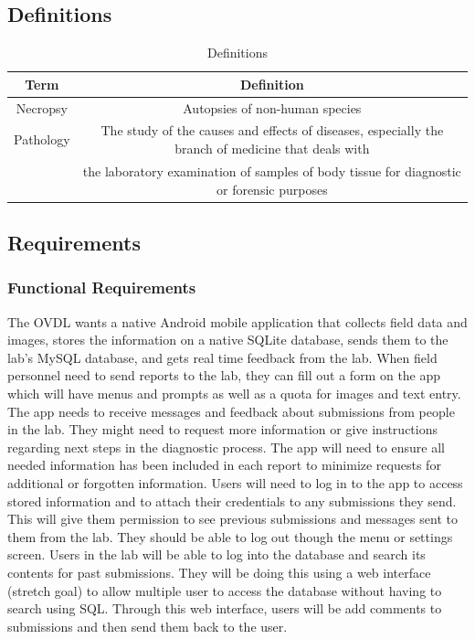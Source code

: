 \documentclass[onecolumn, draftclsnofoot,10pt, compsoc]{IEEEtran}
\begin{document}
\subsection{Definitions}
\begin{table}[ht]
\caption{Definitions}
\centering
\begin{tabular}{c|c}
\hline
    Term  &  Definition\\
    \hline
    \hline
    Necropsy   &   Autopsies of non-human species\\
    \hline
    Pathology    &   The study of the causes and effects of diseases, especially the branch of medicine that deals with \\
    & the laboratory examination of samples of body tissue for diagnostic or forensic purposes\\
    \hline
\end{tabular}
\end{table}

\subsection{Requirements}
\subsubsection{Functional Requirements}
The OVDL wants a native Android mobile application that collects field data and images, stores the information on a native SQLite database, sends them to the lab's MySQL database, and gets real time feedback from the lab. 
When field personnel need to send reports to the lab, they can fill out a form on the app which will have menus and prompts as well as a quota for images and text entry.
\newline
The app needs to receive messages and feedback about submissions from people in the lab. 
They might need to request more information or give instructions regarding next steps in the diagnostic process. 
The app will need to ensure all needed information has been included in each report to minimize requests for additional or forgotten information. 
\newline
Users will need to log in to the app to access stored information and to attach their credentials to any submissions they send. This will give them permission to see previous submissions and messages sent to them from the lab. 
They should be able to log out though the menu or settings screen. 
\newline 
Users in the lab will be able to log into the database and search its contents for past submissions. They will be doing this using a web interface (stretch goal) to allow multiple user to access the database without having to search using SQL. Through this web interface, users will be add comments to submissions and then send them back to the user. 
\end{document}
